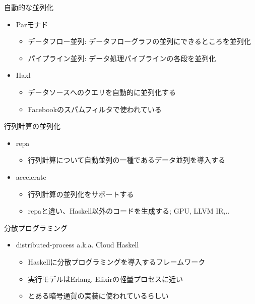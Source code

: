 \documentclass[unicode,12pt]{beamer}
\begin{document}
\begin{frame}{自動的な並列化}
  \begin{itemize}
  \item Parモナド
    \begin{itemize}
    \item データフロー並列: データフローグラフの並列にできるところを並列化
    \item パイプライン並列: データ処理パイプラインの各段を並列化
    \end{itemize}
  \item Haxl
    \begin{itemize}
    \item データソースへのクエリを自動的に並列化する
    \item Facebookのスパムフィルタで使われている
    \end{itemize}
  \end{itemize}
\end{frame}

\begin{frame}{行列計算の並列化}
  \begin{itemize}
  \item repa
    \begin{itemize}
      \item 行列計算について自動並列の一種であるデータ並列を導入する
    \end{itemize}
  \item accelerate
    \begin{itemize}
      \item 行列計算の並列化をサポートする
      \item repaと違い、Haskell以外のコードを生成する; GPU, LLVM IR,..
      \end{itemize}
  \end{itemize}
\end{frame}

\begin{frame}{分散プログラミング}
  \begin{itemize}
  \item distributed-process a.k.a. Cloud Haskell
    \begin{itemize}
    \item Haskellに分散プログラミングを導入するフレームワーク
    \item 実行モデルはErlang, Elixirの軽量プロセスに近い
    \item とある暗号通貨の実装に使われているらしい
    \end{itemize}
  \end{itemize}
\end{frame}
\end{document}
